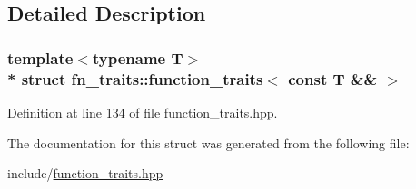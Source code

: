 \subsection{Detailed Description}
\subsubsection*{template$<$typename T$>$\\*
struct fn\+\_\+traits\+::function\+\_\+traits$<$ const T \&\& $>$}



Definition at line 134 of file function\+\_\+traits.\+hpp.



The documentation for this struct was generated from the following file\+:\begin{DoxyCompactItemize}
\item 
include/\hyperlink{function__traits_8hpp}{function\+\_\+traits.\+hpp}\end{DoxyCompactItemize}
